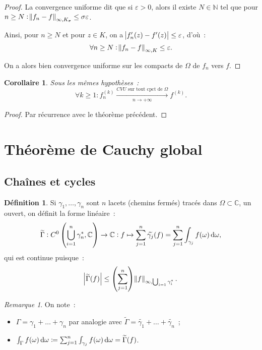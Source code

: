\documentclass{report}
\newtheorem{cor}[thm]{Corollaire}
\theoremstyle{definition}
\newtheorem{déf}[thm]{Définition}
\theoremstyle{remark}
\newtheorem*{rmq}{Remarque}
\numberwithin{equation}{section}
\newcommand{\C}{\mathbb C}
\newcommand{\N}{\mathbb N}
\newcommand{\CONV}[5]{\xrightarrow[#2 \to #3]{#4 \text{ #5 } #1}}
\newcommand{\CVUc}[3]{\CONV{#1}{#2}{#3}{CVU}{sur tout cpct de}}
\newcommand{\pinfty}{{+\infty}}
\begin{document}
\begin{proof}
			La convergence uniforme dit que si $\varepsilon > 0$, alors il existe $N \in \N$ tel que pour
			$n \geq N : \norm {f_n-f}_{\infty, K_\sigma} \leq \sigma\varepsilon$.

			Ainsi, pour $n \geq N$ et pour $z \in K$, on a $\abs {f_n'(z)-f'(z)} \leq \varepsilon$, d'où~:
			\begin{equation}
				\forall n \geq N : \norm {f_n-f}_{\infty, K} \leq \varepsilon.
			\end{equation}

			On a alors bien convergence uniforme sur les compacts de $\Omega$ de $f_n$ vers $f$.
			\end{proof}

			\begin{cor} Sous les mêmes hypothèses~:
			\begin{equation}
				\forall k \geq 1 : f_n^{(k)} \CVUc \Omega n\pinfty f^{(k)}.
			\end{equation}
			\end{cor}

			\begin{proof} Par récurrence avec le théorème précédent.
			\end{proof}

	\section{Théorème de Cauchy global}
		\subsection{Chaînes et cycles}
			\begin{déf} Si $\gamma_1, \ldots,  \gamma_n$ sont $n$ lacets (chemins fermés) tracés dans $\Omega \subset \C$, un ouvert, on définit la forme linéaire~:
			\begin{equation}
				\widetilde \Gamma : C^0\left(\bigcup_{i=1}^n\gamma_n^*, \C\right) \to \C :
				f \mapsto \sum_{j=1}^n\widetilde {\gamma_j}(f) = \sum_{j=1}^n\int_{\gamma_j}f(\omega)\dif \omega,
			\end{equation}
			qui est continue puisque~:
			\begin{equation}
				\abs {\widetilde \Gamma(f)} \leq \left(\sum_{j=1}^n\right)\norm f_{\infty, \bigcup_{i=1}\gamma_i^*}.
			\end{equation}
			\end{déf}

			\begin{rmq} On note~:
			\begin{itemize}
				\item $\Gamma = \gamma_1 + \ldots + \gamma_n$ par analogie avec $\widetilde \Gamma = \widetilde {\gamma_1} + \ldots + \widetilde {\gamma_n}$~;
				\item $\int_\Gamma f(\omega)\dif \omega \coloneqq \sum_{j=1}^n\int_{\gamma_j}f(\omega)\dif \omega = \widetilde \Gamma(f)$.
			\end{itemize}
			\end{rmq}
\end{document}

